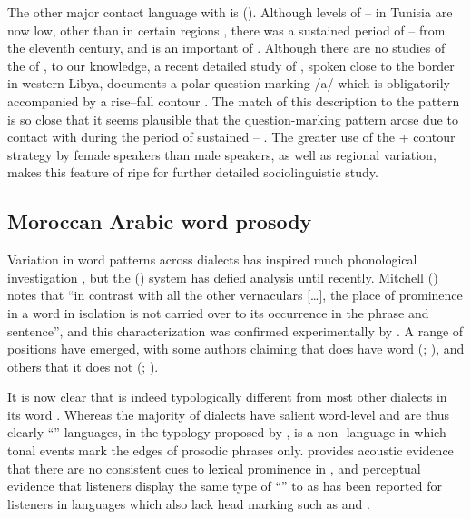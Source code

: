\documentclass[output=paper]{langsci/langscibook}
\begin{document}
The other major contact language with  is  (). Although levels of --  in Tunisia are now low, other than in certain regions \citep{Gabsi2011}, there was a sustained period of --  from the eleventh century, and  is an important  of  \citep{Daoud2007}. Although there are no studies of the  of , to our knowledge, a recent detailed study of  , spoken close to the  border in western Libya, documents a polar question marking  /a/ which is obligatorily accompanied by a rise--fall contour \citep{Gussenhoven2017}. The match of this description to the  pattern is so close that it seems plausible that the  question-marking pattern arose due to contact with  during the period of sustained -- . The greater use of the  + contour strategy by female speakers than male speakers, as well as regional variation, makes this feature of  ripe for further detailed sociolinguistic study.


 
 \subsection{Moroccan Arabic word prosody} \label{moroc}


Variation in word  patterns across  dialects has inspired much phonological investigation \citep{Watson2011stress}, but the  ()  system has defied analysis until recently. Mitchell (\citeyear[202]{Mitchell1993}) notes that “in contrast with all the other vernaculars […], the place of prominence in a word in isolation is not carried over to its occurrence in the phrase and sentence”, and this characterization was confirmed experimentally by \citet{Boudlal2001}. A range of positions have emerged, with some authors claiming that  does have word  (\citealt{Benkirane1998}; \citealt{BurdinEtAl2014}), and others that it does not (\citealt{Maas2013}; \citealt{ElZarka2012}). 

It is now clear that  is indeed typologically different from most other  dialects in its word . Whereas the majority of  dialects have salient word-level  and are thus clearly ``'' languages, in the typology proposed by \citet{Jun2005},  is a non- language in which tonal events mark the edges of prosodic phrases only. \citet{Bruggeman2018} provides acoustic evidence that there are no consistent cues to lexical prominence in , and perceptual evidence that  listeners display the same type of ``'' to  as has been reported for listeners in languages which also lack head marking such as  \citep{DupouxPeperkamp2001} and  \citep{RahmaniRietveldGussenhoven2015}.
\end{document}
